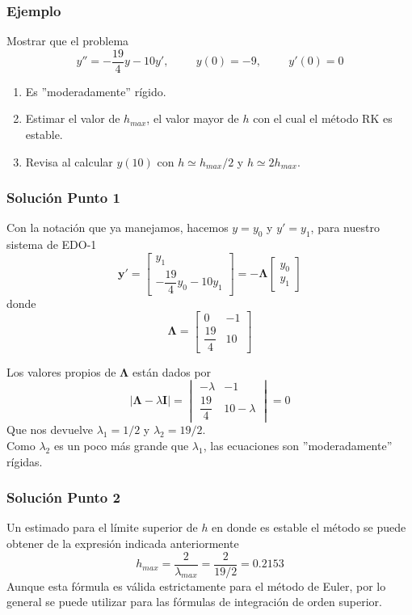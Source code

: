 \begin{frame}
\frametitle{Ejemplo}
Mostrar que el problema
\[ y'' = - \dfrac{19}{4}y - 10 y', \hspace{1cm} y(0)=-9, \hspace{1cm} y'(0)=0 \]
\begin{enumerate}
\item Es ''moderadamente'' rígido.
\item Estimar el valor de $h_{max}$, el valor mayor de $h$ con el cual el método RK es estable. \item Revisa al calcular $y(10)$ con $h \simeq h_{max}/2$ y $h \simeq 2 h_{max}$.
\end{enumerate}
\end{frame}
\begin{frame}
\frametitle{Solución Punto 1}
Con la notación que ya manejamos, hacemos $y=y_{0}$ y $y'=y_{1}$, para nuestro sistema de EDO-1
\[ \mathbf{y}' = \begin{bmatrix}
y_{1} \\
- \dfrac{19}{4} y_{0} - 10 y_{1}
\end{bmatrix}  =
- \mathbf{\Lambda}
\begin{bmatrix}
y_{0} \\
y_{1}
\end{bmatrix}
\]
\pause
donde
\[ \mathbf{\Lambda} = 
\begin{bmatrix}
0 & -1 \\
\dfrac{19}{4} & 10
\end{bmatrix}
\]
\end{frame}
\begin{frame}
Los valores propios de $\mathbf{\Lambda}$ están dados por
\[ \vert \mathbf{\Lambda} - \lambda \mathbf{I} \vert = 
\begin{vmatrix}
- \lambda & -1 \\
\dfrac{19}{4} & 10 - \lambda
\end{vmatrix} = 0 \]
Que nos devuelve $\lambda_{1} = 1/2$ y $\lambda_{2} = 19/2$.
\\
\medskip
Como $\lambda_{2}$ es un poco más grande que $\lambda_{1}$, las ecuaciones son ''moderadamente'' rígidas.
\end{frame}
\begin{frame}
\frametitle{Solución Punto 2}
Un estimado para el límite superior de $h$ en donde es estable el método se puede obtener de la expresión indicada anteriormente
\[ h_{max} = \dfrac{2}{\lambda_{max}} = \dfrac{2}{19/2} = 0.2153\]
Aunque esta fórmula es válida estrictamente para el método de Euler, por lo general se puede utilizar para las fórmulas de integración de orden superior.
\end{frame}
